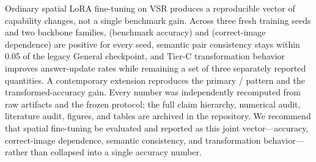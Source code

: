 Ordinary spatial LoRA fine-tuning on VSR produces a reproducible vector of
capability changes, not a single benchmark gain. Across three fresh
training seeds and two backbone families, \dA{} (benchmark accuracy) and
\dG{} (correct-image dependence) are positive for every seed, semantic
pair consistency \dC{} stays within 0.05 of the legacy General checkpoint,
and Tier-C transformation behavior improves answer-update rates while
remaining a set of three separately reported quantities. A contemporary
\qwennew{} extension reproduces the primary \dA{}/\dG{} pattern and the
transformed-accuracy gain. Every number was independently recomputed from
raw artifacts and the frozen protocol; the full claim hierarchy,
numerical audit, literature audit, figures, and tables are archived in the
repository. We recommend that spatial fine-tuning be evaluated and
reported as this joint vector---accuracy, correct-image dependence,
semantic consistency, and transformation behavior---rather than collapsed
into a single accuracy number.
